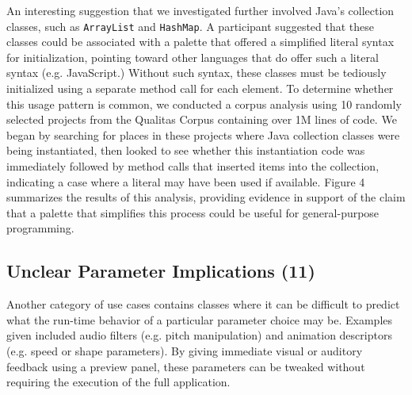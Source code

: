 \documentclass[10pt, conference, compsocconf]{IEEEtran}
\begin{document}
An interesting suggestion that we investigated further involved Java's collection classes, such as \verb|ArrayList| and \verb|HashMap|. A participant suggested that these classes could be associated with a palette that offered a simplified literal syntax for initialization, pointing toward other languages that do offer such a literal syntax (e.g. JavaScript.) Without such syntax, these classes must be tediously initialized using a separate method call for each element. To determine whether this usage pattern is common, we conducted a corpus analysis using 10 randomly selected projects from the Qualitas Corpus \cite{QualitasCorpus:APSEC:2010} containing over 1M lines of code. We began by searching for places in these projects where Java collection classes were being instantiated, then looked to see whether this instantiation code was immediately followed by method calls that inserted items into the collection, indicating a case where a literal may have been used if available. Figure 4 summarizes the results of this analysis, providing evidence in support of the claim that a palette that simplifies this process could be useful for general-purpose programming.

\subsection{Unclear Parameter Implications (11)}
Another category of use cases contains classes where it can be difficult to predict what the run-time behavior of a particular parameter choice may be. Examples given included audio filters (e.g. pitch manipulation) and animation descriptors (e.g. speed or shape parameters). By giving immediate visual or auditory feedback using a preview panel, these parameters can be tweaked without requiring the execution of the full application.


%
%	
%	
%	
\end{document}
